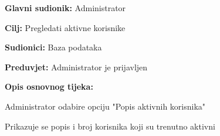 	\noindent {}
	\begin{packed_item}
		
		\item \textbf{Glavni sudionik: }Administrator
		\item  \textbf{Cilj:} Pregledati aktivne korisnike
		\item  \textbf{Sudionici:} Baza podataka
		\item  \textbf{Preduvjet:} Administrator je prijavljen
		\item  \textbf{Opis osnovnog tijeka:}
		
		\item[] \begin{packed_enum}
			
			\item Administrator odabire opciju "Popis aktivnih korisnika"
			\item Prikazuje se popis i broj korisnika koji su trenutno aktivni
			
		\end{packed_enum}
	\end{packed_item}

